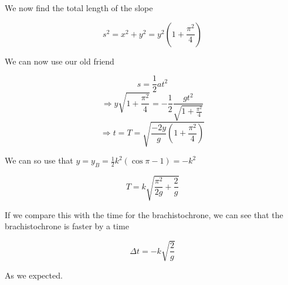 \documentclass[a4paper,norsk, 10pt]{article}
\begin{document}
We now find the total length of the slope

$$
s^2 = x^2 + y^2 = y^2(1+\frac{\pi^2}{4})
$$

We can now use our old friend

$$
s = \frac{1}{2}at^2
$$
$$
\Rightarrow y\sqrt{1+\frac{\pi^2}{4}} = -\frac{1}{2}\frac{gt^2}{\sqrt{1+\frac{\pi^2}{4}}}
$$
$$
\Rightarrow t = T = \sqrt{\frac{-2y}{g}\left(1 + \frac{\pi^2}{4}\right)}
$$

We can so use that $y = y_B = \frac{1}{2}k^2(\cos\pi - 1) = -k^2$

$$
T = k\sqrt{\frac{\pi^2}{2g} + \frac{2}{g}}
$$

If we compare this with the time for the brachistochrone, we can see that the brachistochrone is faster by a time 

$$
\Delta t = -k\sqrt{\frac{2}{g}}
$$

As we expected.
\end{document}
